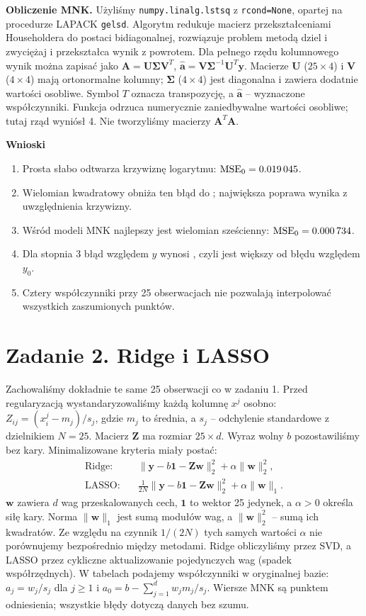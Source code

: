 \documentclass[10pt,a4paper]{article}
\begin{document}
\textbf{Obliczenie MNK.}
Użyliśmy \texttt{numpy.linalg.lstsq} z \texttt{rcond=None}, opartej na procedurze
LAPACK \texttt{gelsd}. Algorytm redukuje macierz przekształceniami Householdera
do postaci bidiagonalnej, rozwiązuje problem metodą dziel i zwyciężaj
i przekształca wynik z powrotem.
Dla pełnego rzędu kolumnowego wynik można zapisać jako
$\mathbf A=\mathbf U\boldsymbol\Sigma\mathbf V^T$,
$\widehat{\mathbf a}=\mathbf V\boldsymbol\Sigma^{-1}\mathbf U^T\mathbf y$.
Macierze $\mathbf U$ ($25\times4$) i $\mathbf V$ ($4\times4$) mają ortonormalne kolumny;
$\boldsymbol\Sigma$ ($4\times4$) jest diagonalna i zawiera dodatnie wartości osobliwe.
Symbol $T$ oznacza transpozycję, a $\widehat{\mathbf a}$ -- wyznaczone współczynniki.
Funkcja odrzuca numerycznie zaniedbywalne wartości osobliwe; tutaj rząd wyniósł 4.
Nie tworzyliśmy macierzy $\mathbf A^T\mathbf A$.

\textbf{Wnioski}
\begin{enumerate}
\item Prosta słabo odtwarza krzywiznę logarytmu: $\mathrm{MSE}_0=\num{0.019045}$.
\item Wielomian kwadratowy obniża ten błąd do \QuadraticMse; największa poprawa wynika z uwzględnienia krzywizny.
\item Wśród modeli MNK najlepszy jest wielomian sześcienny: $\mathrm{MSE}_0=\num{0.000734}$.
\item Dla stopnia 3 błąd względem $y$ wynosi \CubicNoisyMse, czyli jest większy od błędu względem $y_0$.
\item Cztery współczynniki przy 25 obserwacjach nie pozwalają interpolować wszystkich zaszumionych punktów.
\end{enumerate}

\clearpage
\section*{Zadanie 2. Ridge i LASSO}
Zachowaliśmy dokładnie te same 25 obserwacji co w zadaniu 1.
Przed regularyzacją wystandaryzowaliśmy każdą kolumnę $x^j$ osobno:
$Z_{ij}=(x_i^j-m_j)/s_j$, gdzie $m_j$ to średnia, a $s_j$ -- odchylenie
standardowe z dzielnikiem $N=25$. Macierz $\mathbf Z$ ma rozmiar $25\times d$.
Wyraz wolny $b$ pozostawiliśmy bez kary. Minimalizowane kryteria miały postać:
\[
\begin{aligned}
\text{Ridge:}\quad&\|\mathbf y-b\mathbf 1-\mathbf Z\mathbf w\|_2^2+\alpha\|\mathbf w\|_2^2,\\
\text{LASSO:}\quad&\frac{1}{2N}\|\mathbf y-b\mathbf 1-\mathbf Z\mathbf w\|_2^2+\alpha\|\mathbf w\|_1.
\end{aligned}
\]
$\mathbf w$ zawiera $d$ wag przeskalowanych cech, $\mathbf 1$ to wektor 25 jedynek,
a $\alpha>0$ określa siłę kary. Norma $\|\mathbf w\|_1$ jest sumą modułów wag,
a $\|\mathbf w\|_2^2$ -- sumą ich kwadratów.
Ze względu na czynnik $1/(2N)$ tych samych wartości $\alpha$ nie porównujemy
bezpośrednio między metodami. Ridge obliczyliśmy przez SVD, a LASSO przez
cykliczne aktualizowanie pojedynczych wag (spadek współrzędnych).
W tabelach podajemy współczynniki w oryginalnej bazie:
$a_j=w_j/s_j$ dla $j\geq1$ i $a_0=b-\sum_{j=1}^{d}w_jm_j/s_j$.
Wiersze MNK są punktem odniesienia; wszystkie błędy dotyczą danych bez szumu.
\end{document}
